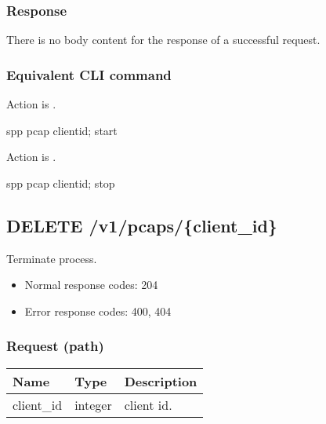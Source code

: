 \documentclass[a4paper,11pt,openany,oneside,english]{sphinxmanual}
\begin{document}
\subsubsection{Response}
\label{\detokenize{api_ref/spp_pcap:id3}}
There is no body content for the response of a successful  request.


\subsubsection{Equivalent CLI command}
\label{\detokenize{api_ref/spp_pcap:id4}}
Action is .

\begin{sphinxVerbatim}[commandchars=\\\{\},formatcom=\footnotesize]
spp \PYGZgt{} pcap \PYGZob{}client\PYGZus{}id\PYGZcb{}; start
\end{sphinxVerbatim}

Action is .

\begin{sphinxVerbatim}[commandchars=\\\{\},formatcom=\footnotesize]
spp \PYGZgt{} pcap \PYGZob{}client\PYGZus{}id\PYGZcb{}; stop
\end{sphinxVerbatim}


\subsection{DELETE /v1/pcaps/\{client\_id\}}
\label{\detokenize{api_ref/spp_pcap:delete-v1-pcaps-client-id}}
Terminate  process.
\begin{itemize}
\item {} 
Normal response codes: 204

\item {} 
Error response codes: 400, 404

\end{itemize}


\subsubsection{Request (path)}
\label{\detokenize{api_ref/spp_pcap:id5}}

\begin{savenotes}\sphinxattablestart
\centering
{}
\sphinxthecaptionisattop
{}\label{\detokenize{api_ref/spp_pcap:id15}}\label{\detokenize{api_ref/spp_pcap:table-spp-ctl-pcap-delete}}
\sphinxaftertopcaption
\begin{tabulary}{\linewidth}[t]{|T|T|T|}
\hline
\sphinxstyletheadfamily 
Name
&\sphinxstyletheadfamily 
Type
&\sphinxstyletheadfamily 
Description
\\
\hline
client\_id
&
integer
&
client id.
\\
\hline
\end{tabulary}
\par
\sphinxattableend\end{savenotes}
\end{document}
